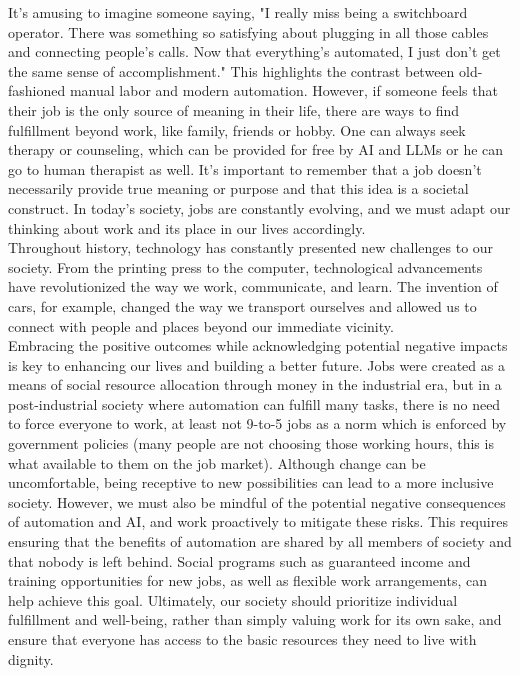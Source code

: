 \documentclass{article}
\begin{document}
It's amusing to imagine someone saying, "I really miss being a switchboard operator. There was something so satisfying about plugging in all those cables and connecting people's calls. Now that everything's automated, I just don't get the same sense of accomplishment." This highlights the contrast between old-fashioned manual labor and modern automation. However, if someone feels that their job is the only source of meaning in their life, there are ways to find fulfillment beyond work, like family, friends or hobby. One can always seek therapy or counseling, which can be provided for free by AI and LLMs or he can go to human therapist as well. It's important to remember that a job doesn't necessarily provide true meaning or purpose and that this idea is a societal construct. In today's society, jobs are constantly evolving, and we must adapt our thinking about work and its place in our lives accordingly.\\

Throughout history, technology has constantly presented new challenges to our society. From the printing press to the computer, technological advancements have revolutionized the way we work, communicate, and learn. The invention of cars, for example, changed the way we transport ourselves and allowed us to connect with people and places beyond our immediate vicinity.\\

Embracing the positive outcomes while acknowledging potential negative impacts is key to enhancing our lives and building a better future.  Jobs were created as a means of social resource allocation through money in the industrial era, but in a post-industrial society where automation can fulfill many tasks, there is no need to force everyone to work, at least not 9-to-5 jobs as a norm which is enforced by government policies (many people are not choosing those working hours, this is what available to them on the job market). Although change can be uncomfortable, being receptive to new possibilities can lead to a more inclusive society. However, we must also be mindful of the potential negative consequences of automation and AI, and work proactively to mitigate these risks. This requires ensuring that the benefits of automation are shared by all members of society and that nobody is left behind. Social programs such as guaranteed income and training opportunities for new jobs, as well as flexible work arrangements, can help achieve this goal. Ultimately, our society should prioritize individual fulfillment and well-being, rather than simply valuing work for its own sake, and ensure that everyone has access to the basic resources they need to live with dignity.
\end{document}
